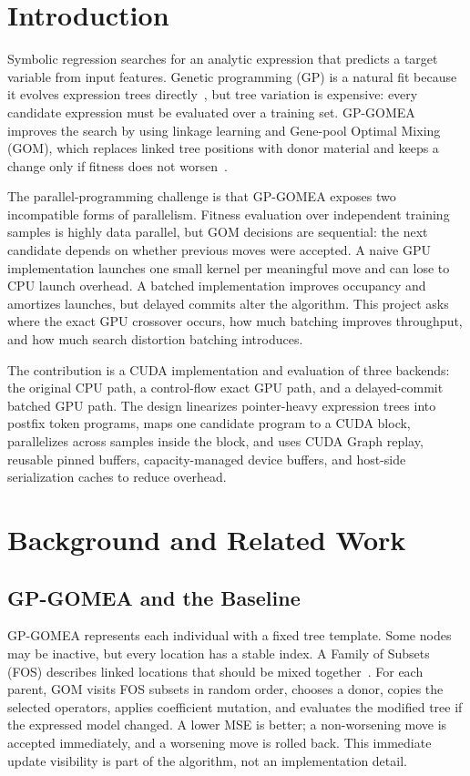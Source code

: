 \documentclass[conference]{IEEEtran}
\newcommand{\gpgomea}{GP-GOMEA\xspace}
\begin{document}
\section{Introduction}

Symbolic regression searches for an analytic expression that predicts a target
variable from input features. Genetic programming (GP) is a natural fit because
it evolves expression trees directly~\cite{koza1992genetic,polirefieldguide}, but
tree variation is expensive: every candidate expression must be evaluated over a
training set. \gpgomea improves the search by using linkage learning and
Gene-pool Optimal Mixing (GOM), which replaces linked tree positions with donor
material and keeps a change only if fitness does not worsen~\cite{virgolin2017scalable,virgolin2021improving}.

The parallel-programming challenge is that \gpgomea exposes two incompatible
forms of parallelism. Fitness evaluation over independent training samples is
highly data parallel, but GOM decisions are sequential: the next candidate
depends on whether previous moves were accepted. A naive GPU implementation
launches one small kernel per meaningful move and can lose to CPU launch
overhead. A batched implementation improves occupancy and amortizes launches,
but delayed commits alter the algorithm. This project asks where the exact GPU
crossover occurs, how much batching improves throughput, and how much search
distortion batching introduces.

The contribution is a CUDA implementation and evaluation of three backends:
the original CPU path, a control-flow exact GPU path, and a delayed-commit
batched GPU path. The design linearizes pointer-heavy expression trees into
postfix token programs, maps one candidate program to a CUDA block, parallelizes
across samples inside the block, and uses CUDA Graph replay, reusable pinned
buffers, capacity-managed device buffers, and host-side serialization caches to
reduce overhead.

\section{Background and Related Work}

\subsection{GP-GOMEA and the Baseline}

\gpgomea represents each individual with a fixed tree template. Some nodes may
be inactive, but every location has a stable index. A Family of Subsets (FOS)
describes linked locations that should be mixed together~\cite{thierens2013optimal}.
For each parent, GOM visits FOS subsets in random order, chooses a donor, copies
the selected operators, applies coefficient mutation, and evaluates the modified
tree if the expressed model changed. A lower MSE is better; a non-worsening move
is accepted immediately, and a worsening move is rolled back. This immediate
update visibility is part of the algorithm, not an implementation detail.
\end{document}
